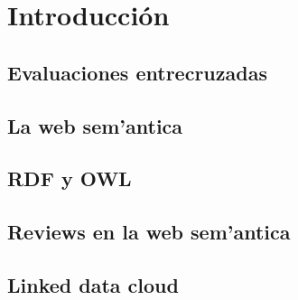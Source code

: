 \section{Introducción}
  \subsection{Evaluaciones entrecruzadas}
    
  \subsection{La web sem'antica}
    
  \subsection{RDF y OWL}
  \subsection{Reviews en la web sem'antica}
  \subsection{Linked data cloud}
